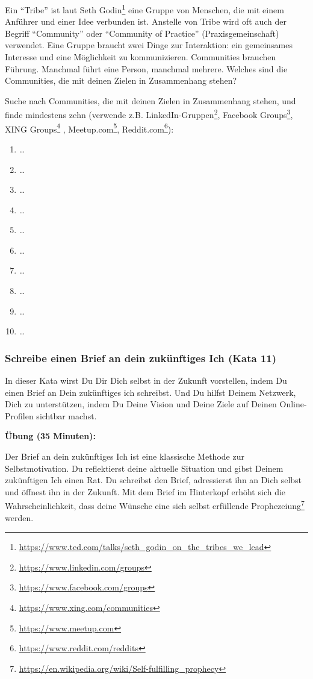 \documentclass[
  ngerman,
  paper=a4,
,captions=tableheading
]{scrartcl}
\DeclareRobustCommand{\href}[2]{#2\footnote{\url{#1}}}
\providecommand{\tightlist}{%
  \setlength{\itemsep}{0pt}\setlength{\parskip}{0pt}}
\begin{document}
Ein ``Tribe'' ist
\href{https://www.ted.com/talks/seth_godin_on_the_tribes_we_lead}{laut
Seth Godin} eine Gruppe von Menschen, die mit einem Anführer und einer
Idee verbunden ist. Anstelle von Tribe wird oft auch der Begriff
``Community'' oder ``Community of Practice'' (Praxisgemeinschaft)
verwendet. Eine Gruppe braucht zwei Dinge zur Interaktion: ein
gemeinsames Interesse und eine Möglichkeit zu kommunizieren. Communities
brauchen Führung. Manchmal führt eine Person, manchmal mehrere. Welches
sind die Communities, die mit deinen Zielen in Zusammenhang stehen?

Suche nach Communities, die mit deinen Zielen in Zusammenhang stehen,
und finde mindestens zehn (verwende z.B.
\href{https://www.linkedin.com/groups}{LinkedIn-Gruppen},
\href{https://www.facebook.com/groups}{Facebook Groups},
\href{https://www.xing.com/communities}{XING Groups} ,
\href{https://www.meetup.com}{Meetup.com},
\href{https://www.reddit.com/reddits}{Reddit.com}):

\begin{enumerate}
\def\labelenumi{\arabic{enumi}.}
\tightlist
\item
  \ldots{}
\item
  \ldots{}
\item
  \ldots{}
\item
  \ldots{}
\item
  \ldots{}
\item
  \ldots{}
\item
  \ldots{}
\item
  \ldots{}
\item
  \ldots{}
\item
  \ldots{}
\end{enumerate}

\hypertarget{schreibe-einen-brief-an-dein-zukuxfcnftiges-ich-kata-11}{%
\subsubsection{Schreibe einen Brief an dein zukünftiges Ich (Kata
11)}\label{schreibe-einen-brief-an-dein-zukuxfcnftiges-ich-kata-11}}

In dieser Kata wirst Du Dir Dich selbst in der Zukunft vorstellen, indem
Du einen Brief an Dein zukünftiges ich schreibst. Und Du hilfst Deinem
Netzwerk, Dich zu unterstützen, indem Du Deine Vision und Deine Ziele
auf Deinen Online-Profilen sichtbar machst.

\textbf{Übung (35 Minuten):}

Der Brief an dein zukünftiges Ich ist eine klassische Methode zur
Selbstmotivation. Du reflektierst deine aktuelle Situation und gibst
Deinem zukünftigen Ich einen Rat. Du schreibst den Brief, adressierst
ihn an Dich selbst und öffnest ihn in der Zukunft. Mit dem Brief im
Hinterkopf erhöht sich die Wahrscheinlichkeit, dass deine Wünsche eine
\href{https://en.wikipedia.org/wiki/Self-fulfilling_prophecy}{sich
selbst erfüllende Prophezeiung} werden.
\end{document}
